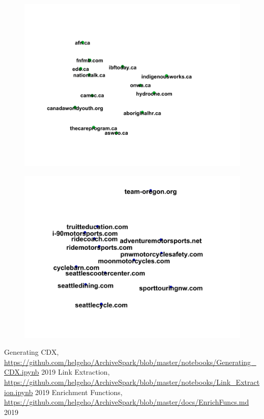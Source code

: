 \documentclass[conference]{IEEEtran}
\begin{document}
\begin{figure}[htbp]
 \centerline{\includegraphics[width=\columnwidth]{figs/indigenous.png}}
 \caption{}
\end{figure}

\begin{figure}[htbp]
 \centerline{\includegraphics[width=\columnwidth]{figs/motor.png}}
 \caption{}
\end{figure}

\begin{thebibliography}{00}
		Generating CDX, 
		\url{https://github.com/helgeho/ArchiveSpark/blob/master/notebooks/Generating_CDX.ipynb}
		2019
		Link Extraction, 
		\url{https://github.com/helgeho/ArchiveSpark/blob/master/notebooks/Link_Extraction.ipynb}
		2019
		Enrichment Functions, 
		\url{https://github.com/helgeho/ArchiveSpark/blob/master/docs/EnrichFuncs.md}
		2019
\end{thebibliography}
\end{document}
